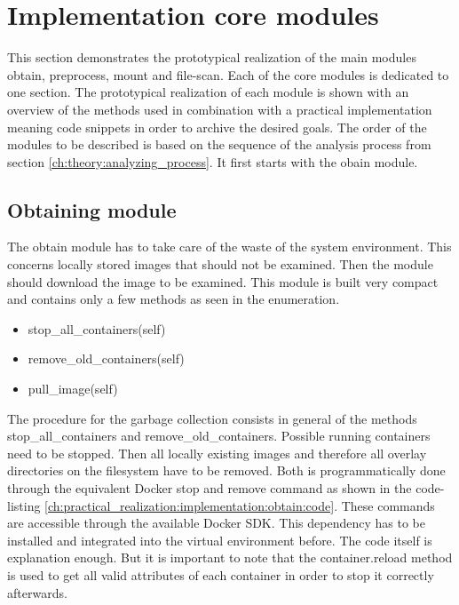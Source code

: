 \section{Implementation core modules}
\label{ch:practical_realization:implementation}
This section demonstrates the prototypical realization of the main modules obtain, preprocess, mount and file-scan.
Each of the core modules is dedicated to one section.
The prototypical realization of each module is shown with an overview of the methods used in combination with a practical implementation meaning code snippets in order to archive the desired goals. 
The order of the modules to be described is based on the sequence of the analysis process from section \ref{ch:theory:analyzing_process}.
It first starts with the obain module.

\subsection{Obtaining module}
\label{ch:practical_realization:implementation:obtain}
The obtain module has to take care of the waste of the system environment. 
This concerns locally stored images that should not be examined. 
Then the module should download the image to be examined.
This module is built very compact and contains only a few methods as seen in the enumeration.
\begin{itemize}
\item stop\_all\_containers(self)
\item remove\_old\_containers(self)
\item pull\_image(self)
\end{itemize}
The procedure for the garbage collection consists in general of the methods stop\_all\_containers and remove\_old\_containers.
Possible running containers need to be stopped.
Then all locally existing images and therefore all overlay directories on the filesystem have to be removed. 
Both is programmatically done through the equivalent Docker stop and remove command as shown in the code-listing \ref{ch:practical_realization:implementation:obtain:code}. 
These commands are accessible through the available Docker SDK. 
This dependency has to be installed and integrated into the virtual environment before. 
The code itself is explanation enough. 
But it is important to note that the container.reload method is used to get all valid attributes of each container in order to stop it correctly afterwards.

